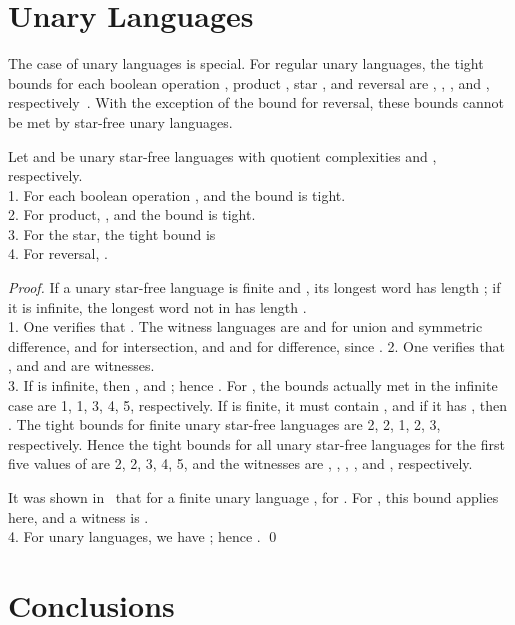 \documentclass{llncs}
\begin{document}
\section{Unary Languages}
\label{sec:unary}
The case of unary languages is special. For regular unary languages, the tight bounds for each boolean operation , product , star , and reversal  are , , , and , respectively~\cite{YZS94}. With the exception of the bound for reversal, these bounds cannot be met by star-free unary languages.


\begin{theorem}
\label{thm:unary}
Let  and  be unary star-free languages with quotient complexities  and , respectively. \\
    1. 
For each boolean operation  ,  and the bound is tight.\\
   2. 
For product,  , 
and the bound is tight.\\ 
   3. For the star, the tight bound is
 \\
   4. For reversal, .
\end{theorem}

\begin{proof} If a unary star-free language  is finite and , its longest word has length ; if it is infinite,   the longest word not in  has length  .\\
   1. 
One verifies that . 
The witness languages are   and   for union and symmetric difference, 
 and  for intersection, and  and  for difference, since .
   2. 
One verifies that , and    and  are witnesses.\\
   3. 
 If  is infinite, then , and ; hence
.
For , the bounds actually met in the infinite case are 1, 1, 3, 4, 5, respectively.
If  is finite,  it must contain , and if it has , then .
The tight bounds for finite unary star-free languages are
2, 2, 1, 2, 3, respectively. 
Hence the tight bounds for all unary star-free languages for the first five values of  are 2, 2, 3, 4, 5, and the witnesses are , , , , and , respectively.

It was shown in~\cite{CCSY01} that for a finite unary language ,  for . 
For , this bound applies here, and
a witness is .\\
   4. 
For unary languages, we have ; hence .
\qed
\end{proof}



\section{Conclusions}
\label{sec:conclusions}
\end{document}
